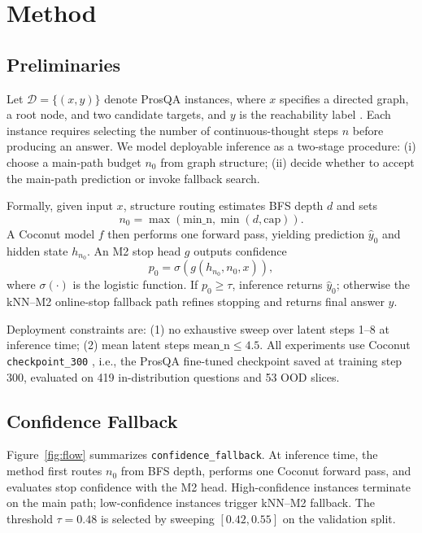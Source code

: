 \documentclass{article}
\begin{document}
\section{Method}

\subsection{Preliminaries}

Let $\mathcal{D}=\{(x,y)\}$ denote ProsQA instances, where $x$ specifies a directed graph, a root node, and two candidate targets, and $y$ is the reachability label \citep{hao2024prosqa}. Each instance requires selecting the number of continuous-thought steps $n$ before producing an answer. We model deployable inference as a two-stage procedure: (i) choose a main-path budget $n_0$ from graph structure; (ii) decide whether to accept the main-path prediction or invoke fallback search.

Formally, given input $x$, structure routing estimates BFS depth $d$ and sets
\[
n_0=\max(\mathrm{min\_n},\min(d,\mathrm{cap})).
\]
A Coconut model $f$ then performs one forward pass, yielding prediction $\hat y_0$ and hidden state $h_{n_0}$. An M2 stop head $g$ outputs confidence
\[
p_0=\sigma(g(h_{n_0},n_0,x)),
\]
where $\sigma(\cdot)$ is the logistic function. If $p_0\ge\tau$, inference returns $\hat y_0$; otherwise the kNN--M2 online-stop fallback path refines stopping and returns final answer $y$.

Deployment constraints are: (1) no exhaustive sweep over latent steps 1--8 at inference time; (2) mean latent steps $\mathrm{mean\_n}\le 4.5$. All experiments use Coconut \texttt{checkpoint\_300} \citep{hao2024coconut}, i.e., the ProsQA fine-tuned checkpoint saved at training step 300, evaluated on 419 in-distribution questions and 53 OOD slices.

\subsection{Confidence Fallback}

Figure~\ref{fig:flow} summarizes \texttt{confidence\_fallback}. At inference time, the method first routes $n_0$ from BFS depth, performs one Coconut forward pass, and evaluates stop confidence with the M2 head. High-confidence instances terminate on the main path; low-confidence instances trigger kNN--M2 fallback. The threshold $\tau=0.48$ is selected by sweeping $[0.42,0.55]$ on the validation split.


\end{document}
